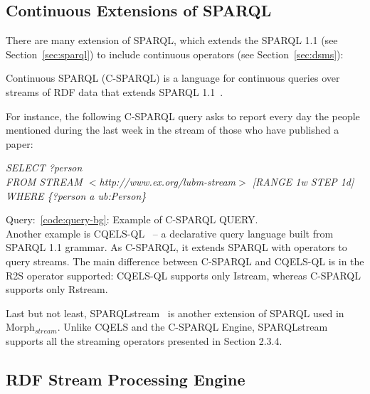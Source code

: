 \subsection{Continuous Extensions of SPARQL}\label{sec:continuous-sparql}

There are many extension of SPARQL, which extends the SPARQL 1.1 (see Section~\ref{sec:sparql}) to include continuous operators (see Section~\ref{sec:dsms}):

Continuous SPARQL (C-SPARQL)  is a language for continuous queries over streams of RDF data that extends SPARQL 1.1~\cite{Barbieri:2010:QRS:1860702.1860705}.

For instance, the following C-SPARQL query asks to report every day the people mentioned during the last week in the stream of those who have published a paper:

\begin{center}
\raggedright
\textit{SELECT ?person}\\
\textit{FROM STREAM $<$http://www.ex.org/lubm-stream$>$ [RANGE 1w STEP 1d]}\\
\textit{WHERE \{?person a ub:Person\}}\\
\label{code:query-bg}
\end{center}
Query:~\ref{code:query-bg}: Example of C-SPARQL QUERY.\\

Another example is CQELS-QL~\cite{Lephuoc2011} – a declarative query language built from SPARQL 1.1 grammar. As C-SPARQL, it extends SPARQL with operators to query streams. The main difference between C-SPARQL and CQELS-QL is in the R2S operator supported: CQELS-QL supports only Istream, whereas C-SPARQL supports only Rstream. 

Last but not least, SPARQLstream~\cite{Calbimonte:2010:EOA:1940281.1940289} is another extension of SPARQL used in Morph$_{stream}$. Unlike CQELS and the C-SPARQL Engine, SPARQLstream supports all the streaming operators presented in Section 2.3.4. 

\subsection{RDF Stream Processing Engine}\label{sec:rspengine}

